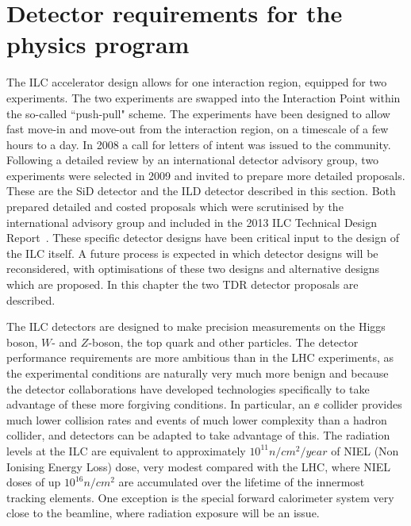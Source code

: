 



\section{Detector requirements for the physics program} 
\label{sec:requirements}

The ILC accelerator design allows for one interaction region, equipped
for two experiments. The two experiments are swapped into the
Interaction Point within the so-called ``push-pull" scheme. The
experiments have been designed to allow fast move-in and move-out from
the interaction region, on a timescale of a few hours to a day. In
2008 a call for letters of intent was issued to the
community. Following a detailed review by an international detector
advisory group, two experiments were selected in 2009 and invited to
prepare more detailed proposals.  These  are the SiD detector and the ILD
detector described in this section. Both prepared detailed and costed proposals which were
scrutinised by the international advisory group and included in the
2013 ILC
Technical Design Report~\cite{Behnke:2013lya}.  These specific detector designs have been critical input to the design of the ILC itself. A future process is expected in which detector designs will be reconsidered, with optimisations of these two designs and alternative designs which are proposed. In this chapter the two TDR detector proposals are
described.

The ILC detectors are designed to make precision measurements on the Higgs boson,  $W$- and $Z$-boson, the top quark and other particles. The detector performance requirements are more ambitious than in the LHC experiments, as the experimental conditions are naturally very much more benign and because the detector collaborations have developed technologies specifically to take advantage of these more forgiving conditions. In particular, an $\ee$ collider provides much lower collision rates and events of much lower complexity than a hadron collider, 
and detectors can be adapted to take advantage of this. The radiation levels at the ILC are equivalent to approximately $10^{11} n/cm^2/year$ of NIEL (Non Ionising Energy Loss) dose, very modest compared with the LHC, where NIEL doses of up $10^{16} n/cm^2$ are accumulated over the lifetime of the innermost tracking elements. One exception is the special forward calorimeter system very close to the
beamline, where radiation exposure will be an issue. 




